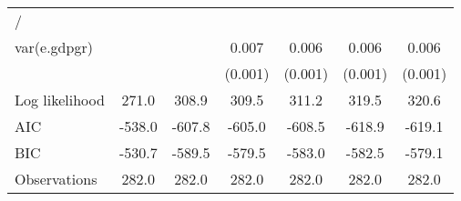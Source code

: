 \begin{table}[htbp]
\begin{tabular}{l*{6}{c}}
\hline
/                   &                     &                     &                     &                     &                     &                     \\
var(e.gdpgr)        &                     &                     &       0.007\sym{***}&       0.006\sym{***}&       0.006\sym{***}&       0.006\sym{***}\\
                    &                     &                     &     (0.001)         &     (0.001)         &     (0.001)         &     (0.001)         \\
\hline
Log likelihood      &       271.0         &       308.9         &       309.5         &       311.2         &       319.5         &       320.6         \\
AIC                 &      -538.0         &      -607.8         &      -605.0         &      -608.5         &      -618.9         &      -619.1         \\
BIC                 &      -530.7         &      -589.5         &      -579.5         &      -583.0         &      -582.5         &      -579.1         \\
Observations        &       282.0         &       282.0         &       282.0         &       282.0         &       282.0         &       282.0         \\
\hline\hline
\end{tabular}
\end{table}
